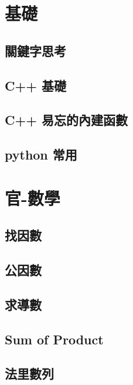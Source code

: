\section{基礎}
\subsection{關鍵字思考}
\raggedbottom
\hrulefill
\subsection{C++ 基礎}
\raggedbottom
\hrulefill
\subsection{C++ 易忘的內建函數}
\raggedbottom
\hrulefill
\subsection{python 常用}
\raggedbottom
\hrulefill

\section{官-數學}
\subsection{找因數}
\raggedbottom
\hrulefill
\subsection{公因數}
\raggedbottom
\hrulefill
\subsection{求導數}
\raggedbottom
\hrulefill
\subsection{Sum of Product}
\raggedbottom
\hrulefill
\subsection{法里數列}
\raggedbottom
\hrulefill

